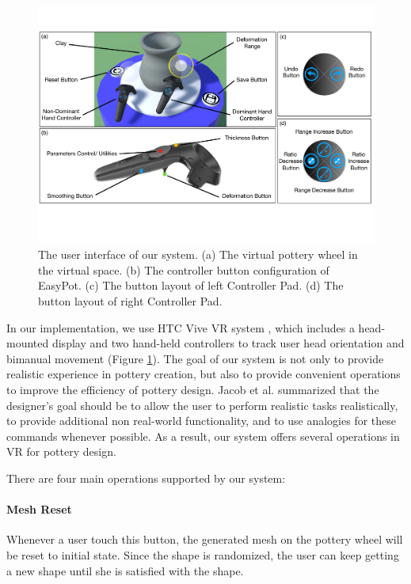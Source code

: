 \documentclass{svjour3}                     %
\begin{document}
\begin{figure}
\includegraphics[width=\textwidth]{ui}
\caption{The user interface of our system. (a) The virtual pottery wheel in the virtual space. (b) The controller button configuration of EasyPot. (c) The button layout of left Controller Pad. (d) The button layout of right Controller Pad.}
\label{fig:ui}
\end{figure}

In our implementation, we use HTC Vive VR system \cite{website:vive}, which includes a head-mounted display and two hand-held controllers to track user head orientation and bimanual movement (Figure \ref{fig:ui}).
The goal of our system is not only to provide realistic experience in pottery creation, but also to provide convenient operations to improve the efficiency of pottery design. 
Jacob et al. \cite{Jacob2008Reality} summarized that the designer's goal should be to allow the user to perform realistic tasks realistically, to provide additional non real-world functionality, and to use analogies for these commands whenever possible.
As a result, our system offers several operations in VR for pottery design.


There are four main operations supported by our system:

\paragraph{Mesh Reset}
Whenever a user touch this button, the generated mesh on the pottery wheel will be reset to initial state. Since the shape is randomized, the user can keep getting a new shape until she is satisfied with the shape.
\end{document}
